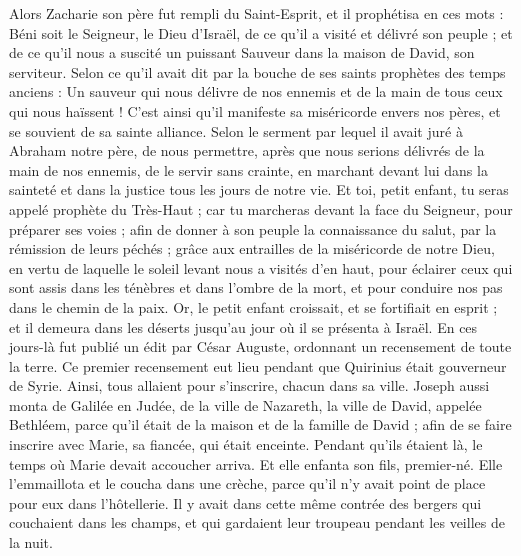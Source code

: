 \begin{multicols}{2}
Alors Zacharie son père fut rempli du Saint-Esprit, et il prophétisa en ces mots :
Béni soit le Seigneur, le Dieu d'Israël, de ce qu'il a visité et délivré son peuple ;
et de ce qu'il nous a suscité un puissant Sauveur dans la maison de David, son serviteur.
Selon ce qu'il avait dit par la bouche de ses saints prophètes des temps anciens :
Un sauveur qui nous délivre de nos ennemis et de la main de tous ceux qui nous haïssent !
C’est ainsi qu’il manifeste sa miséricorde envers nos pères, et se souvient de sa sainte alliance.
Selon le serment par lequel il avait juré à Abraham notre père,
de nous permettre, après que nous serions délivrés de la main de nos ennemis, de le servir sans crainte,
en marchant devant lui dans la sainteté et dans la justice tous les jours de notre vie.
Et toi, petit enfant, tu seras appelé prophète du Très-Haut ; car tu marcheras devant la face du Seigneur, pour préparer ses voies ;
afin de donner à son peuple la connaissance du salut, par la rémission de leurs péchés ;
grâce aux entrailles de la miséricorde de notre Dieu, en vertu de laquelle le soleil levant nous a visités d’en haut,
pour éclairer ceux qui sont assis dans les ténèbres et dans l'ombre de la mort, et pour conduire nos pas dans le chemin de la paix.
Or, le petit enfant croissait, et se fortifiait en esprit ; et il demeura dans les déserts jusqu'au jour où il se présenta à Israël.
\VerseOne{}En ces jours-là fut publié un édit par César Auguste, ordonnant un recensement de toute la terre.
Ce premier recensement eut lieu pendant que Quirinius était gouverneur de Syrie.
Ainsi, tous allaient pour s’inscrire, chacun dans sa ville.
Joseph aussi monta de Galilée en Judée, de la ville de Nazareth, la ville de David, appelée Bethléem, parce qu’il était de la maison et de la famille de David ;
afin de se faire inscrire avec Marie, sa fiancée, qui était enceinte.
Pendant qu’ils étaient là, le temps où Marie devait accoucher arriva.
Et elle enfanta son fils, premier-né. Elle l'emmaillota et le coucha dans une crèche, parce qu'il n'y avait point de place pour eux dans l'hôtellerie.
Il y avait dans cette même contrée des bergers qui couchaient dans les champs, et qui gardaient leur troupeau pendant les veilles de la nuit.

\end{multicols}
